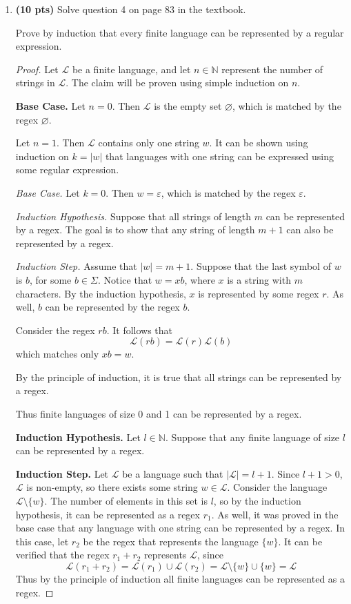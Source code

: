 \documentclass[11pt]{article}
\begin{document}
\begin{enumerate}[label=\textbf{Q\arabic*.}]
\item \textbf{(10 pts)} Solve question 4 on page 83 in the textbook.

Prove by induction that every finite language can be represented by a regular expression.
\begin{proof}
	Let \(\mathcal{L}\) be a finite language, and let \(n \in \mathbb{N}\) represent the number of strings in \(\mathcal{L}\). The claim will be proven using simple induction on \(n\).

	\textbf{Base Case.} Let \(n = 0\). Then \(\mathcal{L}\) is the empty set \(\varnothing\), which is matched by the regex \(\varnothing\).

	Let \(n=1\). Then \(\mathcal{L}\) contains only one string \(w\). It can be shown using induction on \(k=|w|\) that languages with one string can be expressed using some regular expression.

	\textit{Base Case.} Let \(k=0\). Then \(w = \varepsilon\), which is matched by the regex \(\varepsilon\).

	\textit{Induction Hypothesis.} Suppose that all strings of length \(m\) can be represented by a regex. The goal is to show that any string of length \(m+1\) can also be represented by a regex.

	\textit{Induction Step.} Assume that \(|w| = m+1\). Suppose that the last symbol of \(w\) is \(b\), for some \(b \in \Sigma\). Notice that \(w = xb\), where \(x\) is a string with \(m\) characters. By the induction hypothesis, \(x\) is represented by some regex \(r\). As well, \(b\) can be represented by the regex \(b\).

	Consider the regex \(rb\). It follows that
	\[
		\mathcal{L} (rb) = \mathcal{L} (r) \mathcal{L} (b)
	\]
	which matches only \(xb = w\).

	By the principle of induction, it is true that all strings can be represented by a regex.

	Thus finite languages of size 0 and 1 can be represented by a regex.

	\textbf{Induction Hypothesis.} Let \(l \in \mathbb{N}\). Suppose that any finite language of size \(l\) can be represented by a regex.

	\textbf{Induction Step.} Let \(\mathcal{L}\) be a language such that \(|\mathcal{L}| = l + 1\). Since \(l+1 > 0\), \(\mathcal{L}\) is non-empty, so there exists some string \(w \in \mathcal{L}\). Consider the language \(\mathcal{L} \setminus \{w\}\). The number of elements in this set is \(l\), so by the induction hypothesis, it can be represented as a regex \(r_1\). As well, it was proved in the base case that any language with one string can be represented by a regex. In this case, let \(r_2\) be the regex that represents the language \(\{w\}\). It can be verified that the regex \(r_1 + r_2\) represents \(\mathcal{L}\), since
	\[
		\mathcal{L} (r_1 + r_2) = \mathcal{L} (r_1) \cup \mathcal{L} (r_2) = \mathcal{L} \setminus \{w\} \cup \{w\} = \mathcal{L}
	\]
	Thus by the principle of induction all finite languages can be represented as a regex.


\end{proof}
\end{enumerate}
\end{document}
